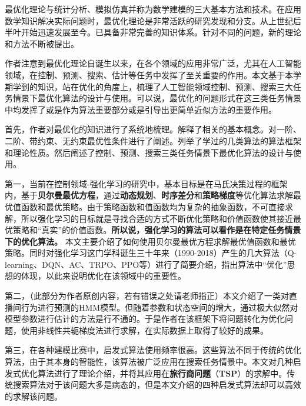 \begin{abstractzh}

最优化理论与统计分析、模拟仿真并称为数学建模的三大基本方法和技术。在应用数学知识解决实际问题时，最优化理论是非常活跃的研究发现和分支。从上世纪后半叶开始迅速发展至今。已具备非常完善的知识体系。针对不同的问题，新的理论和方法不断被提出。

作者注意到最优化理论自诞生以来，在各个领域的应用非常广泛，尤其在人工智能领域，在控制、预测、搜索、估计等任务中发挥了至关重要的作用。本文基于本学期学到的知识，站在优化的角度上，梳理了人工智能领域控制、预测、搜索三大任务情景下最优化算法的设计与使用。可以说，最优化的问题形式在这三类任务情景中均发挥了或是作为算法重要部分或是引导出更简单近似方法的重要作用。

首先，作者对最优化的知识进行了系统地梳理。解释了相关的基本概念。对一阶、二阶、带约束、无约束最优性条件进行了阐述。列举了学过的几类算法的算法框架和理论性质。然后阐述了控制、预测、搜索三类任务情景下最优化算法的设计与使用。

第一，当前在控制领域-强化学习的研究中，基本目标是在马氏决策过程的框架内，基于\textbf{贝尔曼最优方程}，通过\textbf{动态规划}、\textbf{时序差分}和\textbf{策略梯度}等优化算法求解最优值函数和最优策略。由于策略函数和值函数均为复杂的抽象函数，不可直接求解，所以强化学习的目标就是寻找合适的方式不断优化策略和价值函数使其接近最优策略和“真实”的价值函数。\textbf{所以说，强化学习的算法可以看作是在特定任务情景下的优化算法。} 本文主要介绍了如何使用贝尔曼最优方程求解最优值函数和最优策略。同时对强化学习这门学科诞生三十年来（1990-2018）产生的几大算法（Q-learning、DQN、AC、TRPO、PPO等）进行了简要介绍，指出算法中“优化”思想的体现，以此来说明优化在该领域中的重要性。

第二，（此部分为作者原创内容，若有错误之处请老师指正）本文介绍了一类对直播间行为进行预测的HMM模型。但随着参数和状态空间的增大，通过极大似然对模型参数进行估计的方法是行不通的。于是作者在该框架下将问题转化为优化问题，使用非线性共轭梯度法进行求解，在实际数据上取得了较好的成果。

第三，在各种建模比赛中，启发式算法使用频率很高。这些算法不同于传统的优化算法，由于其本身的智能性，该算法被广泛应用在搜索任务情景中。本文对几种启发式优化算法进行了理论介绍，并将其应用在\textbf{旅行商问题}（\textbf{TSP}）的求解中。传统搜索算法对于该问题大多是病态的，但是本文介绍的四种启发式算法却可以高效的求解该问题。

\end{abstractzh}